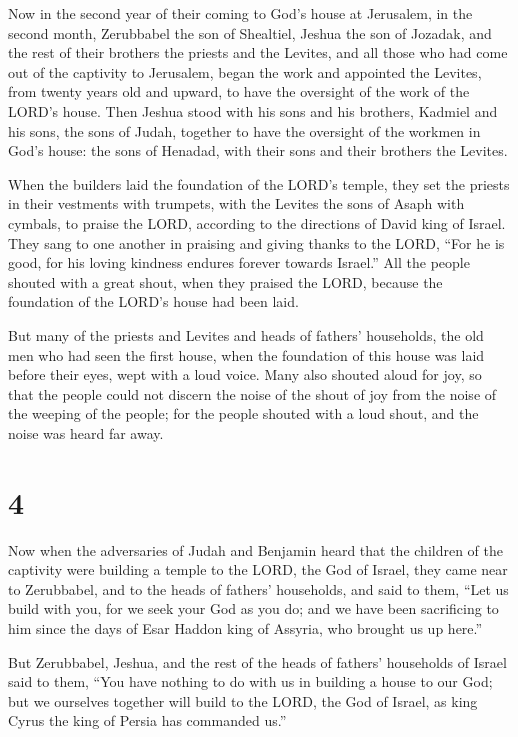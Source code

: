  Now in the second year of their coming to God's house at
Jerusalem, in the second month, Zerubbabel the son of Shealtiel, Jeshua
the son of Jozadak, and the rest of their brothers the priests and the
Levites, and all those who had come out of the captivity to Jerusalem,
began the work and appointed the Levites, from twenty years old and
upward, to have the oversight of the work of the LORD's house.
 Then Jeshua stood with his sons and his brothers, Kadmiel
and his sons, the sons of Judah, together to have the oversight of the
workmen in God's house: the sons of Henadad, with their sons and their
brothers the Levites.

 When the builders laid the foundation of the LORD's
temple, they set the priests in their vestments with trumpets, with the
Levites the sons of Asaph with cymbals, to praise the LORD, according to
the directions of David king of Israel.  They sang to one
another in praising and giving thanks to the LORD, ``For he is good, for
his loving kindness endures forever towards Israel.'' All the people
shouted with a great shout, when they praised the LORD, because the
foundation of the LORD's house had been laid.

 But many of the priests and Levites and heads of fathers'
households, the old men who had seen the first house, when the
foundation of this house was laid before their eyes, wept with a loud
voice. Many also shouted aloud for joy,  so that the people
could not discern the noise of the shout of joy from the noise of the
weeping of the people; for the people shouted with a loud shout, and the
noise was heard far away.

\hypertarget{section-3}{%
\section{4}\label{section-3}}

 Now when the adversaries of Judah and Benjamin heard that
the children of the captivity were building a temple to the LORD, the
God of Israel,  they came near to Zerubbabel, and to the
heads of fathers' households, and said to them, ``Let us build with you,
for we seek your God as you do; and we have been sacrificing to him
since the days of Esar Haddon king of Assyria, who brought us up here.''

 But Zerubbabel, Jeshua, and the rest of the heads of
fathers' households of Israel said to them, ``You have nothing to do
with us in building a house to our God; but we ourselves together will
build to the LORD, the God of Israel, as king Cyrus the king of Persia
has commanded us.''

